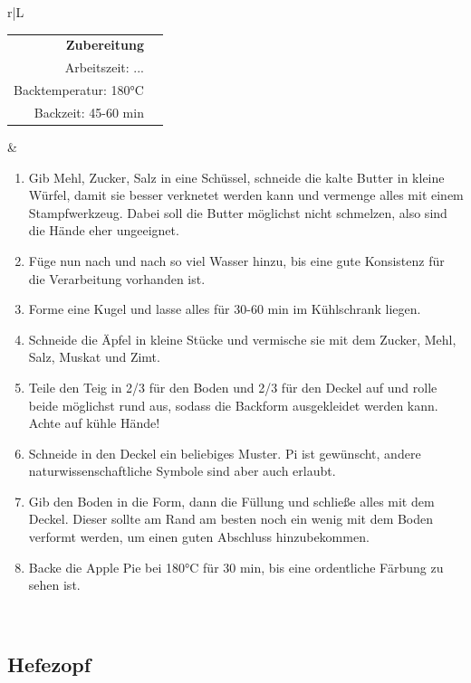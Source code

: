 \documentclass[a4paper, 12pt]{scrbook} 								%
\numberwithin{equation}{section} 									%
\begin{document}
		\begin{tabularx}{\textwidth}{r|L}
			\begin{tabular}[t]{rr}
				\textbf{Zubereitung}	\\
				Arbeitszeit: ...	\\
				Backtemperatur: 180°C \\
				Backzeit: 45-60 min \\
			\end{tabular}			&	\begin{enumerate}[nosep]
											\item Gib Mehl, Zucker, Salz in eine Schüssel, schneide die kalte Butter in kleine Würfel, damit sie besser verknetet werden kann und vermenge alles mit einem Stampfwerkzeug. Dabei soll die Butter möglichst nicht schmelzen, also sind die Hände eher ungeeignet.
											\item Füge nun nach und nach so viel Wasser hinzu, bis eine gute Konsistenz für die Verarbeitung vorhanden ist.
											\item Forme eine Kugel und lasse alles für 30-60 min im Kühlschrank liegen.
											\item Schneide die Äpfel in kleine Stücke und vermische sie mit dem Zucker, Mehl, Salz, Muskat und Zimt.
											\item Teile den Teig in 2/3 für den Boden und 2/3 für den Deckel auf und rolle beide möglichst rund aus, sodass die Backform ausgekleidet werden kann. Achte auf kühle Hände!
											\item Schneide in den Deckel ein beliebiges Muster. Pi ist gewünscht, andere naturwissenschaftliche Symbole sind aber auch erlaubt.
											\item Gib den Boden in die Form, dann die Füllung und schließe alles mit dem Deckel. Dieser sollte am Rand am besten noch ein wenig mit dem Boden verformt werden, um einen guten Abschluss hinzubekommen.
											\item Backe die Apple Pie bei 180°C für 30 min, bis eine ordentliche Färbung zu sehen ist. 
										\end{enumerate}	\\
		\end{tabularx}
		\newpage


		\subsection{Hefezopf}	\label{Hefezopf}
\end{document}
